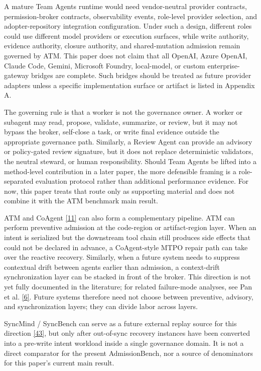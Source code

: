 \documentclass[9pt,letterpaper]{extarticle}
\begin{document}
A mature Team Agents runtime would need vendor-neutral provider contracts, permission-broker contracts, observability events, role-level provider selection, and adopter-repository integration configuration. Under such a design, different roles could use different model providers or execution surfaces, while write authority, evidence authority, closure authority, and shared-mutation admission remain governed by ATM. This paper does not claim that all OpenAI, Azure OpenAI, Claude Code, Gemini, Microsoft Foundry, local-model, or custom enterprise-gateway bridges are complete. Such bridges should be treated as future provider adapters unless a specific implementation surface or artifact is listed in Appendix A.

The governing rule is that a worker is not the governance owner. A worker or subagent may read, propose, validate, summarize, or review, but it may not bypass the broker, self-close a task, or write final evidence outside the appropriate governance path. Similarly, a Review Agent can provide an advisory or policy-gated review signature, but it does not replace deterministic validators, the neutral steward, or human responsibility. Should Team Agents be lifted into a method-level contribution in a later paper, the more defensible framing is a role-separated evaluation protocol rather than additional performance evidence. For now, this paper treats that route only as supporting material and does not combine it with the ATM benchmark main result.

ATM and CoAgent \textcolor{atmLinkBlue}{\hyperlink{Item.47}{[11]}} can also form a complementary pipeline. ATM can perform preventive admission at the code-region or artifact-region layer. When an intent is serialized but the downstream tool chain still produces side effects that could not be declared in advance, a CoAgent-style MTPO repair path can take over the reactive recovery. Similarly, when a future system needs to suppress contextual drift between agents earlier than admission, a context-drift synchronization layer can be stacked in front of the broker. This direction is not yet fully documented in the literature; for related failure-mode analyses, see Pan et al. \textcolor{atmLinkBlue}{\hyperlink{Item.42}{[6]}}. Future systems therefore need not choose between preventive, advisory, and synchronization layers; they can divide labor across layers.

SyncMind / SyncBench can serve as a future external replay source for this direction \textcolor{atmLinkBlue}{\hyperlink{Item.79}{[43]}}, but only after out-of-sync recovery instances have been converted into a pre-write intent workload inside a single governance domain. It is not a direct comparator for the present AdmissionBench, nor a source of denominators for this paper's current main result.
\end{document}
